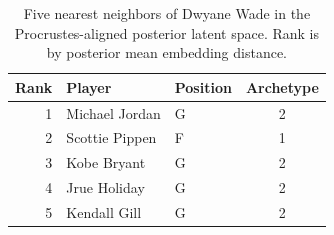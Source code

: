 \begin{table}[htbp]
  \centering\small
  \begin{tabular}{rllc}
    \toprule
    Rank & Player & Position & Archetype \\
    \midrule
    1 & Michael Jordan & G & 2 \\
    2 & Scottie Pippen & F & 1 \\
    3 & Kobe Bryant & G & 2 \\
    4 & Jrue Holiday & G & 2 \\
    5 & Kendall Gill & G & 2 \\
    \bottomrule
  \end{tabular}
  \caption{Five nearest neighbors of Dwyane Wade in the Procrustes-aligned posterior latent space. Rank is by posterior mean embedding distance.}
  \label{tab:Dwyane_Wade_neighbors}
\end{table}

